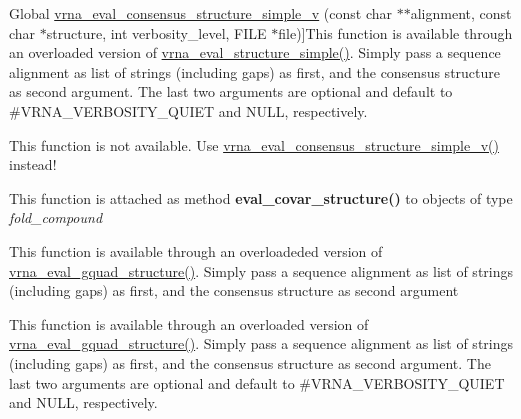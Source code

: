 \begin{DoxyRefList}
%
Global \hyperlink{group__eval_gad88927c62ab0a8b534e078e44be1b36e}{vrna\+\_\+eval\+\_\+consensus\+\_\+structure\+\_\+simple\+\_\+v} (const char $\ast$$\ast$alignment, const char $\ast$structure, int verbosity\+\_\+level, F\+I\+LE $\ast$file)]This function is available through an overloaded version of \hyperlink{group__eval_ga7e5273464b775d4130245681312c1369}{vrna\+\_\+eval\+\_\+structure\+\_\+simple()}. Simply pass a sequence alignment as list of strings (including gaps) as first, and the consensus structure as second argument. The last two arguments are optional and default to \#\+V\+R\+N\+A\+\_\+\+V\+E\+R\+B\+O\+S\+I\+T\+Y\+\_\+\+Q\+U\+I\+ET and N\+U\+LL, respectively.  
\item[\label{wrappers__wrappers000044}%
\Hypertarget{wrappers__wrappers000044}%
Global \hyperlink{group__eval_ga1c07851f6b665c3461a19e9e4eb33d26}{vrna\+\_\+eval\+\_\+consensus\+\_\+structure\+\_\+simple\+\_\+verbose} (const char $\ast$$\ast$alignment, const char $\ast$structure, F\+I\+LE $\ast$file)]This function is not available. Use \hyperlink{group__eval_gad88927c62ab0a8b534e078e44be1b36e}{vrna\+\_\+eval\+\_\+consensus\+\_\+structure\+\_\+simple\+\_\+v()} instead!  
\item[\label{wrappers__wrappers000029}%
\Hypertarget{wrappers__wrappers000029}%
Global \hyperlink{group__eval_ga6cea75c0eb9857fb59172be54cab09e0}{vrna\+\_\+eval\+\_\+covar\+\_\+structure} (vrna\+\_\+fold\+\_\+compound\+\_\+t $\ast$vc, const char $\ast$structure)]This function is attached as method {\bfseries eval\+\_\+covar\+\_\+structure()} to objects of type {\itshape fold\+\_\+compound}  
\item[\label{wrappers__wrappers000041}%
\Hypertarget{wrappers__wrappers000041}%
Global \hyperlink{group__eval_gaf09a326b3d57a4b30c27bd0e216198ac}{vrna\+\_\+eval\+\_\+gquad\+\_\+consensus\+\_\+structure} (const char $\ast$$\ast$alignment, const char $\ast$structure)]This function is available through an overloadeded version of \hyperlink{group__eval_ga3263504825ef4b523eba797c99921df4}{vrna\+\_\+eval\+\_\+gquad\+\_\+structure()}. Simply pass a sequence alignment as list of strings (including gaps) as first, and the consensus structure as second argument  
\item[\label{wrappers__wrappers000051}%
\Hypertarget{wrappers__wrappers000051}%
Global \hyperlink{group__eval_ga8abc794fc48d43268ced5e8cde017baa}{vrna\+\_\+eval\+\_\+gquad\+\_\+consensus\+\_\+structure\+\_\+v} (const char $\ast$$\ast$alignment, const char $\ast$structure, int verbosity\+\_\+level, F\+I\+LE $\ast$file)]This function is available through an overloaded version of \hyperlink{group__eval_ga3263504825ef4b523eba797c99921df4}{vrna\+\_\+eval\+\_\+gquad\+\_\+structure()}. Simply pass a sequence alignment as list of strings (including gaps) as first, and the consensus structure as second argument. The last two arguments are optional and default to \#\+V\+R\+N\+A\+\_\+\+V\+E\+R\+B\+O\+S\+I\+T\+Y\+\_\+\+Q\+U\+I\+ET and N\+U\+LL, respectively.  

\end{DoxyRefList}
